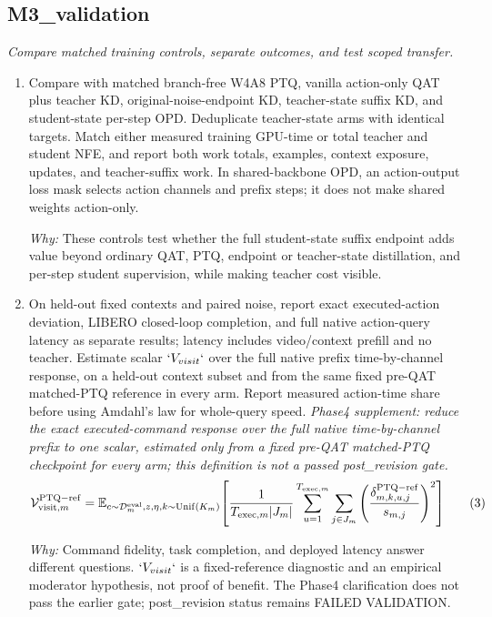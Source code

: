 \documentclass[10pt,a4paper]{article}
\begin{document}
\subsection*{M3\_validation}
\emph{Compare matched training controls, separate outcomes, and test scoped transfer.}
\begin{enumerate}[leftmargin=*,start=5]
  \item Compare with matched branch-free W4A8 PTQ, vanilla action-only QAT plus teacher KD, original-noise-endpoint KD, teacher-state suffix KD, and student-state per-step OPD. Deduplicate teacher-state arms with identical targets. Match either measured training GPU-time or total teacher and student NFE, and report both work totals, examples, context exposure, updates, and teacher-suffix work. In shared-backbone OPD, an action-output loss mask selects action channels and prefix steps;\allowbreak{} it does not make shared weights action-only.
\par\emph{Why:} These controls test whether the full student-state suffix endpoint adds value beyond ordinary QAT, PTQ, endpoint or teacher-state distillation, and per-step student supervision, while making teacher cost visible.
  \item On held-out fixed contexts and paired noise, report exact executed-action deviation, LIBERO closed-loop completion, and full native action-query latency as separate results;\allowbreak{} latency includes video/context prefill and no teacher. Estimate scalar \(`V_{visit}`\) over the full native prefix time-by-channel response, on a held-out context subset and from the same fixed pre-QAT matched-PTQ reference in every arm. Report measured action-time share before using Amdahl's law for whole-query speed.
\noindent\emph{Phase4 supplement: reduce the exact executed-command response over the full native time-by-channel prefix to one scalar, estimated only from a fixed pre-QAT matched-PTQ checkpoint for every arm;\allowbreak{} this definition is not a passed post\_revision gate.}
\begin{equation}
\resizebox{\ifdim\width>\linewidth \linewidth\else\width\fi}{!}{$\displaystyle \mathcal{V}^{\mathrm{PTQ-ref}}_{\mathrm{visit},m}=\mathbb{E}_{c\sim\mathcal{D}^{\mathrm{eval}}_m,z,\eta,k\sim\operatorname{Unif}(K_m)}\!\left[\frac{1}{T_{\mathrm{exec},m}|J_m|}\sum_{u=1}^{T_{\mathrm{exec},m}}\sum_{j\in J_m}\left(\frac{\delta^{\mathrm{PTQ-ref}}_{m,k,u,j}}{s_{m,j}}\right)^2\right]$} \tag{3}
\end{equation}
\par\emph{Why:} Command fidelity, task completion, and deployed latency answer different questions. \(`V_{visit}`\) is a fixed-reference diagnostic and an empirical moderator hypothesis, not proof of benefit. The Phase4 clarification does not pass the earlier gate;\allowbreak{} post\_revision status remains FAILED VALIDATION.

\end{enumerate}
\end{document}
